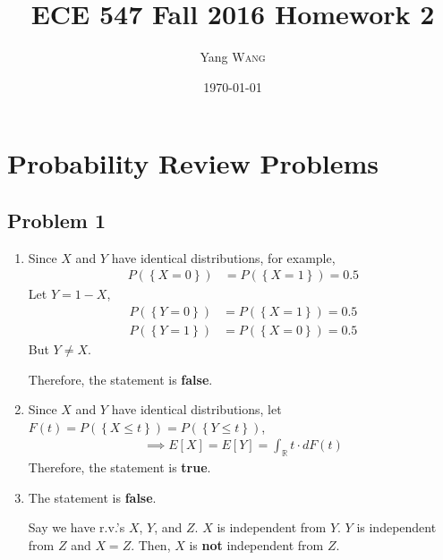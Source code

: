 \documentclass{article}
\title{ECE 547 Fall 2016 Homework 2} %
\author{Yang \textsc{Wang}}  %
\date{\today} %
\begin{document}
\maketitle %


\section*{Probability Review Problems}
	\subsection*{Problem 1}
		\begin{enumerate}
			\item Since $X$ and $Y$ have identical distributions, for example,
				\begin{align*}
					P(\left\{ X = 0 \right\}) &= P(\left\{ X = 1 \right\}) = 0.5
				\end{align*}
				Let $Y = 1 - X$,
				\begin{align*}
					P(\left\{ Y = 0 \right\}) &= P(\left\{ X = 1 \right\}) = 0.5 \\
					P(\left\{ Y = 1 \right\}) &= P(\left\{ X = 0 \right\}) = 0.5
				\end{align*}
				But $Y \neq X$.

				Therefore, the statement is \textbf{false}.
			\item Since $X$ and $Y$ have identical distributions,
				let $F(t) = P(\left\{X \leq t\right\}) = P(\left\{Y \leq t\right\})$,
				\begin{gather*}
					\implies E[X] = E[Y] = \int_{\mathbb{R}}^{}t \cdot dF(t)
				\end{gather*}
				Therefore, the statement is \textbf{true}.
			\item The statement is \textbf{false}.
				
				Say we have r.v.'s $X$, $Y$, and
				$Z$. $X$ is independent from $Y$. $Y$ is independent from $Z$ and $X = Z$.
				Then, $X$ is \textbf{not} independent from $Z$.
		\end{enumerate}
\end{document}
